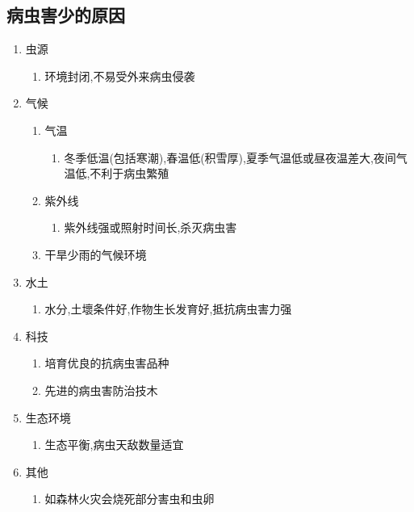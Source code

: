 \documentclass[a4paper]{article}
\begin{document}
    \subsection{病虫害少的原因}
    \begin{enumerate}
        \item 虫源
        \begin{enumerate}
            \item 环境封闭,不易受外来病虫侵袭
        \end{enumerate}
        \item 气候
        \begin{enumerate}
            \item 气温
            \begin{enumerate}
                \item 冬季低温(包括寒潮),春温低(积雪厚),夏季气温低或昼夜温差大,夜间气温低,不利于病虫繁殖
            \end{enumerate}
            \item 紫外线
            \begin{enumerate}
                \item 紫外线强或照射时间长,杀灭病虫害
            \end{enumerate}
            \item 干旱少雨的气候环境
        \end{enumerate}
        \item 水土
        \begin{enumerate}
            \item 水分,土壞条件好,作物生长发育好,抵抗病虫害力强
        \end{enumerate}
        \item 科技
        \begin{enumerate}
            \item 培育优良的抗病虫害品种
            \item 先进的病虫害防治技木
        \end{enumerate}
        \item 生态环境
        \begin{enumerate}
            \item 生态平衡,病虫天敌数量适宜
        \end{enumerate}
        \item 其他
        \begin{enumerate}
            \item 如森林火灾会烧死部分害虫和虫卵
        \end{enumerate}
    \end{enumerate}
\end{document}

